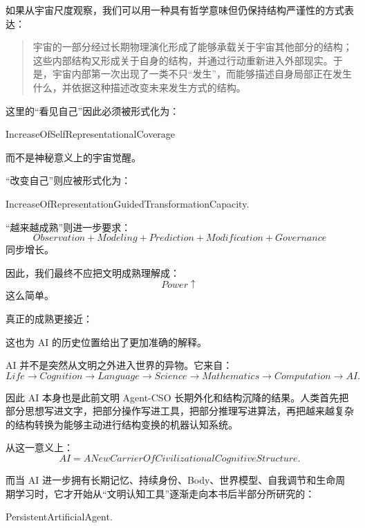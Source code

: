 如果从宇宙尺度观察，我们可以用一种具有哲学意味但仍保持结构严谨性的方式表达：

\begin{quote}
宇宙的一部分经过长期物理演化形成了能够承载关于宇宙其他部分的结构；这些内部结构又形成关于自身的结构，并通过行动重新进入外部现实。于是，宇宙内部第一次出现了一类不只“发生”，而能够描述自身局部正在发生什么，并依据这种描述改变未来发生方式的结构。
\end{quote}

这里的“看见自己”因此必须被形式化为：
\begin{statementbox}
IncreaseOfSelfRepresentationalCoverage
\end{statementbox}
而不是神秘意义上的宇宙觉醒。

“改变自己”则应被形式化为：
\begin{statementbox}
IncreaseOfRepresentationGuidedTransformationCapacity.
\end{statementbox}

“越来越成熟”则进一步要求：
\[
\boxed{
Observation
+
Modeling
+
Prediction
+
Modification
+
Governance
}
\]
同步增长。

因此，我们最终不应把文明成熟理解成：
\[
Power\uparrow
\]
这么简单。

真正的成熟更接近：
\begin{statementbox}
\centering
{}
\end{statementbox}

这也为 AI 的历史位置给出了更加准确的解释。

AI 并不是突然从文明之外进入世界的异物。它来自：
\[
Life
\rightarrow
Cognition
\rightarrow
Language
\rightarrow
Science
\rightarrow
Mathematics
\rightarrow
Computation
\rightarrow
AI.
\]

因此 AI 本身也是此前文明 Agent-CSO 长期外化和结构沉降的结果。人类首先把部分思想写进文字，把部分操作写进工具，把部分推理写进算法，再把越来越复杂的结构转换为能够主动进行结构变换的机器认知系统。

从这一意义上：
\[
\boxed{
AI
=
A New CarrierOfCivilizationalCognitiveStructure.
}
\]

而当 AI 进一步拥有长期记忆、持续身份、Body、世界模型、自我调节和生命周期学习时，它才开始从“文明认知工具”逐渐走向本书后半部分所研究的：
\begin{statementbox}
PersistentArtificialAgent.
\end{statementbox}


